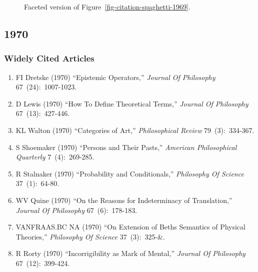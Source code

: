\documentclass[
  10pt,
  letterpaper,
  DIV=11,
  numbers=noendperiod,
  twoside]{scrartcl}
\providecommand{\tightlist}{%
  \setlength{\itemsep}{0pt}\setlength{\parskip}{0pt}}\usepackage{longtable,booktabs,array}
\begin{document}
\begin{figure}


\caption{\label{fig-citation-facet-1969}Faceted version of
Figure~\ref{fig-citation-spaghetti-1969}.}

\end{figure}%

\newpage

\subsection{1970}\label{sec-s1970}

\subsubsection*{Widely Cited Articles}\label{widely-cited-articles-13}

\begin{enumerate}
\def\labelenumi{\arabic{enumi}.}
\tightlist
\item
  FI Dretske (1970) ``Epistemic Operators,'' \emph{Journal Of
  Philosophy} 67~(24):~1007-1023.
\item
  D Lewis (1970) ``How To Define Theoretical Terms,'' \emph{Journal Of
  Philosophy} 67~(13):~427-446.
\item
  KL Walton (1970) ``Categories of Art,'' \emph{Philosophical Review}
  79~(3):~334-367.
\item
  S Shoemaker (1970) ``Persons and Their Pasts,'' \emph{American
  Philosophical Quarterly} 7~(4):~269-285.
\item
  R Stalnaker (1970) ``Probability and Conditionals,'' \emph{Philosophy
  Of Science} 37~(1):~64-80.
\item
  WV Quine (1970) ``On the Reasons for Indeterminacy of Translation,''
  \emph{Journal Of Philosophy} 67~(6):~178-183.
\item
  VANFRAAS.BC NA (1970) ``On Extension of Beths Semantics of Physical
  Theories,'' \emph{Philosophy Of Science} 37~(3):~325-\&.
\item
  R Rorty (1970) ``Incorrigibility as Mark of Mental,'' \emph{Journal Of
  Philosophy} 67~(12):~399-424.
\end{enumerate}
\end{document}

